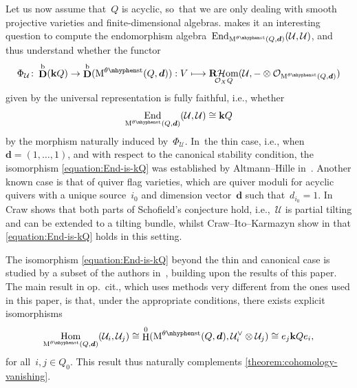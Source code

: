 \documentclass[11pt]{article}
\newcommand\mto{\mathchoice{\longmapsto}{\mapsto}{\mapsto}{\mapsto}}
\theoremstyle{plain}
\theoremstyle{definition}
\DeclareMathOperator\derived{\mathbf{D}}
\DeclareMathOperator\End{End}
\DeclareMathOperator\HH{H}
\DeclareMathOperator\Hom{Hom}
\DeclareMathOperator\RsheafHom{\mathbf{R}\mathcal{H}om}
\newcommand\bounded{\ensuremath{\mathrm{b}}}
\newcommand\field{\mathbf{k}}
\newcommand\stable{\ensuremath{\mhyphen\mathrm{st}}}
\newcommand\tuple[1]{\ensuremath{{\boldsymbol{#1}}}}
\begin{document}
Let us now assume that~$Q$ is acyclic, so~that we are only dealing with smooth projective varieties
and finite-dimensional algebras.
 makes it an interesting question to
compute the endomorphism algebra~$\End_{\modulispace[\theta\stable]{Q,\tuple{d}}}(\mathcal{U},\mathcal{U})$,
and thus understand whether the functor
\begin{equation}
\label{equation:fully-faithful-functor}
\Phi_{\mathcal{U}}\colon
\derived^\bounded(\field Q)\to\derived^\bounded(\modulispace[\theta\stable]{Q,\tuple{d}}):
V\mto\RsheafHom_{\mathcal{O}_XQ}(\mathcal{U},-\otimes\mathcal{O}_{\modulispace[\theta\stable]{Q,\tuple{d}}})
\end{equation}
given by the universal representation is fully faithful,
i.e.,
whether
\begin{equation}
\label{equation:End-is-kQ}
\End_{\modulispace[\theta\stable]{Q,\tuple{d}}}(\mathcal{U},\mathcal{U})
\cong
\field Q
\end{equation}
by the morphism naturally induced by~$\Phi_{\mathcal{U}}$. In~the thin case,
i.e.,
when~$\tuple{d}=(1,\ldots,1)$,
and with respect to the canonical stability condition,
the isomorphism \eqref{equation:End-is-kQ} was established by Altmann--Hille in~\cite[Th.\,1.3]{MR1688469}.
Another known case is that of quiver flag varieties,
which are quiver moduli for acyclic quivers with a unique source~$i_0$
and dimension vector~$\tuple{d}$ such that~$d_{i_0}=1$. In~\cite[Th.\,1.2]{MR2772068} Craw shows that both parts of Schofield's conjecture hold,
i.e.,~$\mathcal{U}$ is partial tilting and can be extended to a tilting bundle,
whilst Craw--Ito--Karmazyn show in \cite[Ex.\,2.9]{MR3803802}
that \eqref{equation:End-is-kQ} holds in this setting.

The isomorphism \eqref{equation:End-is-kQ}
beyond the thin and canonical case
is studied by a subset of the authors in~\cite{MR4883104},
building upon the results of this paper.
The main result in op.~cit.,
which uses methods very different from the ones used in this paper,
is that,
under the appropriate conditions,
there exists explicit isomorphisms
\begin{equation*}
\Hom_{\modulispace[\theta\stable]{Q,\tuple{d}}}(\mathcal{U}_i,\mathcal{U}_j)
\cong
\HH^0(\modulispace[\theta\stable]{Q,\tuple{d}},\mathcal{U}_i^\vee\otimes\mathcal{U}_j)
\cong
e_j\field Qe_i,
\end{equation*}
for all~$i,j\in Q_0$.
This result thus naturally complements \cref{theorem:cohomology-vanishing}.
\end{document}
